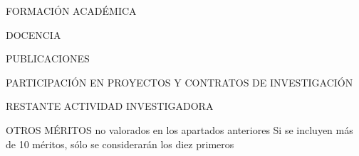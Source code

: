 \documentclass{cvunizar}
\begin{document}








\begin{bloque}{FORMACI\'{O}N ACAD\'{E}MICA}
	
\end{bloque}
\newpage


\begin{bloque}{DOCENCIA}
	
\end{bloque}
\newpage
	

\begin{bloque}{PUBLICACIONES}
	
\end{bloque}
\newpage


\begin{bloque}{PARTICIPACI\'{O}N EN PROYECTOS Y CONTRATOS DE INVESTIGACI\'{O}N}
	
\end{bloque}
\newpage


\begin{bloque}{RESTANTE ACTIVIDAD INVESTIGADORA}
	
\end{bloque}
\newpage
    
    

\begin{bloque}{%
	OTROS M\'{E}RITOS {\Large no valorados en los apartados anteriores}\newline
	{\large Si se incluyen m\'{a}s de 10 méritos, s\'{o}lo se considerar\'{a}n los diez primeros}%
	}%
	
\end{bloque}
\end{document}
